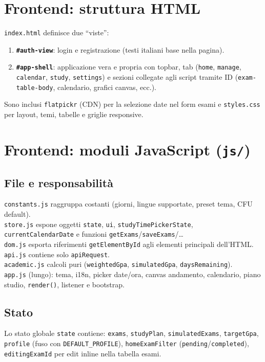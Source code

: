 \documentclass[11pt,a4paper]{article}
\begin{document}
\section{Frontend: struttura HTML}
\texttt{index.html} definisce due ``viste'':
\begin{enumerate}[label=\arabic*.]
  \item \textbf{\texttt{\#auth-view}}: login e registrazione (testi italiani base nella pagina).
  \item \textbf{\texttt{\#app-shell}}: applicazione vera e propria con topbar, tab (\texttt{home}, \texttt{manage}, \texttt{calendar}, \texttt{study}, \texttt{settings}) e sezioni collegate agli script tramite ID (\texttt{exam-table-body}, calendario, grafici canvas, ecc.).
\end{enumerate}
Sono inclusi \texttt{flatpickr} (CDN) per la selezione date nel form esami e \texttt{styles.css} per layout, temi, tabelle e griglie responsive.

\section{Frontend: moduli JavaScript (\texttt{js/})}

\subsection{File e responsabilità}
\texttt{constants.js} raggruppa costanti (giorni, lingue supportate, preset tema, CFU default).\\
\texttt{store.js} espone oggetti \texttt{state}, \texttt{ui}, \texttt{studyTimePickerState}, \texttt{currentCalendarDate} e funzioni \texttt{getExams}/\texttt{saveExams}/\ldots\\
\texttt{dom.js} esporta riferimenti \texttt{getElementById} agli elementi principali dell'HTML.\\
\texttt{api.js} contiene solo \texttt{apiRequest}.\\
\texttt{academic.js} calcoli puri (\texttt{weightedGpa}, \texttt{simulatedGpa}, \texttt{daysRemaining}).\\
\texttt{app.js} (lungo): tema, i18n, picker date/ora, canvas andamento, calendario, piano studio, \texttt{render()}, listener e bootstrap.

\subsection{Stato}
Lo stato globale \texttt{state} contiene: \texttt{exams}, \texttt{studyPlan}, \texttt{simulatedExams}, \texttt{targetGpa}, \texttt{profile} (fuso con \texttt{DEFAULT\_PROFILE}), \texttt{homeExamFilter} (\texttt{pending}/\texttt{completed}), \texttt{editingExamId} per edit inline nella tabella esami.
\end{document}
